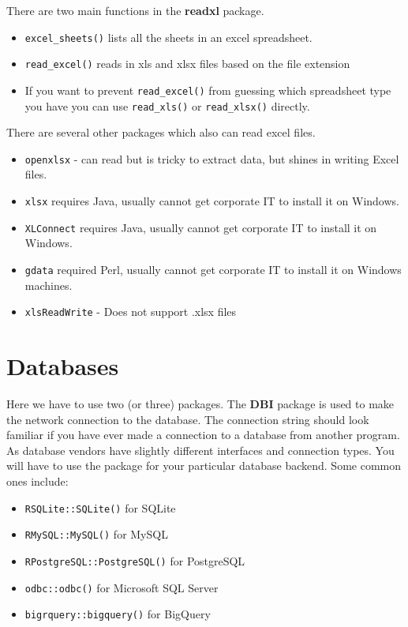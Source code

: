 \documentclass[]{book}
\providecommand{\tightlist}{%
  \setlength{\itemsep}{0pt}\setlength{\parskip}{0pt}}
\newenvironment{rmdblock}[1]
  {\begin{shaded*}
  \begin{itemize}
  \renewcommand{\labelitemi}{
    \raisebox{-.7\height}[0pt][0pt]{
      {\setkeys{Gin}{width=3em,keepaspectratio}\texttt{[image: images/\#1]}}
    }
  }
  \item
  }
  {
  \end{itemize}
  \end{shaded*}
  }
\newenvironment{rmdnote}
  {\begin{rmdblock}{note}}
  {\end{rmdblock}}
\theoremstyle{definition}
\theoremstyle{definition}
\theoremstyle{definition}
\theoremstyle{remark}
\begin{document}
There are two main functions in the \textbf{readxl} package.

\begin{itemize}
\tightlist
\item
  \texttt{excel\_sheets()} lists all the sheets in an excel spreadsheet.
\item
  \texttt{read\_excel()} reads in xls and xlsx files based on the file
  extension
\end{itemize}

\begin{rmdnote}
If you want to prevent \texttt{read\_excel()} from guessing which
spreadsheet type you have you can use \texttt{read\_xls()} or
\texttt{read\_xlsx()} directly.
\end{rmdnote}

There are several other packages which also can read excel files.

\begin{itemize}
\tightlist
\item
  \texttt{openxlsx} - can read but is tricky to extract data, but shines
  in writing Excel files.
\item
  \texttt{xlsx} requires Java, usually cannot get corporate IT to
  install it on Windows.
\item
  \texttt{XLConnect} requires Java, usually cannot get corporate IT to
  install it on Windows.
\item
  \texttt{gdata} required Perl, usually cannot get corporate IT to
  install it on Windows machines.
\item
  \texttt{xlsReadWrite} - Does not support .xlsx files
\end{itemize}

\section{Databases}\label{databases}

Here we have to use two (or three) packages. The \textbf{DBI} package is
used to make the network connection to the database. The connection
string should look familiar if you have ever made a connection to a
database from another program. As database vendors have slightly
different interfaces and connection types. You will have to use the
package for your particular database backend. Some common ones include:

\begin{itemize}
\tightlist
\item
  \texttt{RSQLite::SQLite()} for SQLite
\item
  \texttt{RMySQL::MySQL()} for MySQL
\item
  \texttt{RPostgreSQL::PostgreSQL()} for PostgreSQL
\item
  \texttt{odbc::odbc()} for Microsoft SQL Server
\item
  \texttt{bigrquery::bigquery()} for BigQuery
\end{itemize}
\end{document}
